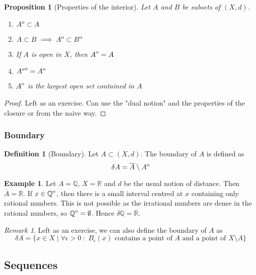 \documentclass{article}
\theoremstyle{definition}
\newtheorem{defn}{Definition}[section]
\newtheorem{exmp}{Example}[section]
\theoremstyle{plain}%
\newtheorem{prop}[thm]{Proposition}
\theoremstyle{remark}
\newtheorem*{rem}{Remark}
\newcommand{\R}{\mathbb{R}}
\newcommand{\Q}{\mathbb{Q}}
\newcommand{\interior}[1]{%
  {\kern0pt#1}^{\mathrm{o}}%
}
\begin{document}
\begin{prop}[Properties of the interior]
Let $A$ and $B$ be subsets of $(X,d)$.
\begin{enumerate}
    \item $\interior{A} \subset A$
    \item $A \subset B \implies \interior{A} \subset \interior{B}$
    \item If $A$ is open in $X$, then $\interior{A} = A$
    \item $\interior{\interior{A}} = \interior{A}$
    \item $\interior{A}$ is the largest open set contained in $A$
\end{enumerate}
\end{prop}

\begin{proof}
Left as an exercise. Can use the "dual notion" and the properties of the closure or from the naive way.
\end{proof}

\subsubsection{Boundary}

\begin{defn}[Boundary]
Let $A \subset (X,d)$. The boundary of $A$ is defined as \[\delta A = \overline{A} \setminus \interior{A}\]
\end{defn}

\begin{exmp}
Let $A = \Q$, $X = \R$ and $d$ be the usual notion of distance. Then $\overline{A} = \R$. If $x \in \interior{\Q}$, then there is a small interval centred at $x$ containing only rational numbers. This is not possible as the irrational numbers are dense in the rational numbers, so $\interior{\Q} = \emptyset$. Hence $\delta \Q = \R$.
\end{exmp}

\begin{rem}
Left as an exercise, we can also define the boundary of $A$ as \[\delta A = \{x \in X \; | \; \forall \epsilon > 0 \; : \; B_{\epsilon}(x) \text{ contains a point of } A \text{ and a point of } X \setminus A\}\]
\end{rem}

\subsection{Sequences}
\end{document}
